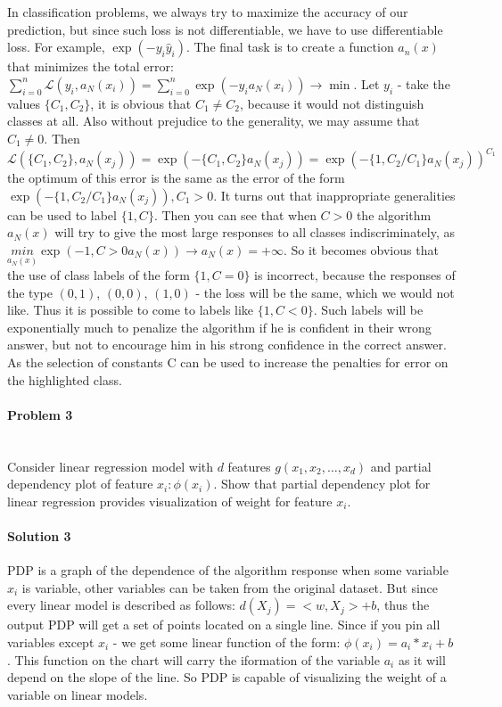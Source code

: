 \documentclass{article}
\begin{document}
In classification problems, we always try to maximize the accuracy of our prediction, but since such loss is not differentiable, we have to use differentiable loss. For example, $\exp (-y_i\hat y_i)$.
The final task is to create a function $a_n (x)$ that minimizes the total error:
$\sum_{i=0}^n\mathcal{L}(y_i, a_N(x_i)) = \sum_{i=0}^n \exp(-y_i a_N(x_i)) \rightarrow \min$. Let $y_i$  - take the values  $\{C_1, C_2\}$,  it is obvious that  $C_1 \neq C_2$,  because it would not distinguish classes at all. Also without prejudice to the generality, we may assume that $C_1 \neq 0$. Then $\mathcal{L}(\{C_1,C_2\},a_N(x_j)) =
\exp(-\{C_1, C_2\}  a_N(x_j)) =
\exp(-\{1, C_2 / C_1\}a_N(x_j))^{C_1}$ the optimum of this error is the same as the error of the form  $\exp(-\{1, C_2 / C_1\}a_N(x_j)), C_1 > 0$.  It turns out that inappropriate generalities can be used to label $\{1, C\}$. Then you can see that when $C > 0$ the algorithm $a_N(x)$ will try to give the most large responses to all classes indiscriminately, as $\underset{a_N(x)}{min} \exp(-{1,C>0}a_N(x)) \rightarrow a_N(x) = +\infty$.
 So it becomes obvious that the use of class labels of the form $\{1, C=0\}$ is incorrect, because the responses of the type $(0, 1)$, $(0, 0)$, $(1, 0)$ - the loss will be the same, which we would not like.
Thus it is possible to come to labels like $\{1, C<0\}$. Such labels will be exponentially much to penalize the algorithm if he is confident in their wrong answer, but not to encourage him in his strong confidence in the correct answer. As the selection of constants C can be used to increase the penalties for error on the highlighted class.


\paragraph{Problem 3}\mbox{}\\

Consider linear regression model with $d$ features $g(x_1, x_2, \dots , x_d)$ and partial dependency plot of feature
$x_i: \phi(x_i)$. Show that partial dependency plot for linear regression provides visualization of weight for feature $x_i$.



\paragraph{Solution 3}\mbox{}

PDP is a graph of the dependence of the algorithm response when some variable $x_i$ is variable, other variables can be taken from the original dataset. But since every linear model is described as follows: $d (X_j) = <w, X_j> + b$, thus the output PDP will get a set of points located on a single line. Since if you pin all variables except $x_i$ - we get some linear function of the form: $\phi(x_i) = a_i * x_i + b$. This function on the chart will carry the iformation of the variable $a_i$ as it will depend on the slope of the line. So PDP is capable of visualizing the weight of a variable on linear models.
\end{document}
